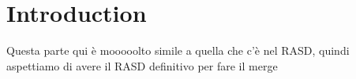 \chapter{Introduction}

{\color{red} Questa parte qui è mooooolto simile a quella che c'è nel RASD, quindi aspettiamo di avere il RASD definitivo per fare il merge}
